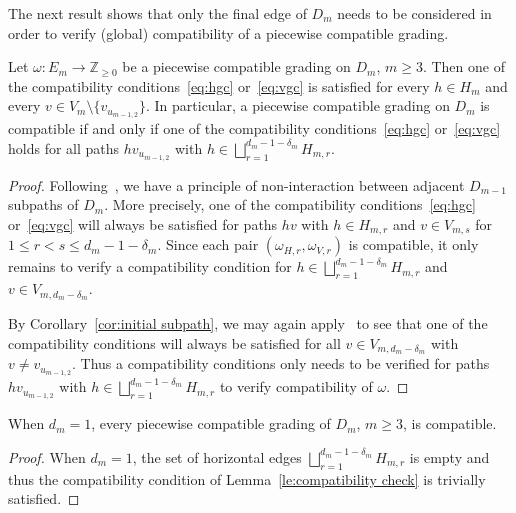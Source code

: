 \documentclass[ALCO,ThmDefs,Unicode,epreuves]{cedram}
\newcommand{\ZZ}{\mathbb{Z}}
\begin{document}
The next result shows that only the final edge of $D_m$ needs to be considered in order to verify (global) compatibility of a piecewise compatible grading.
\begin{lemma}
 \label{le:compatibility check}
 Let $\omega:E_m\to\ZZ_{\ge0}$ be a piecewise compatible grading on $D_m$, $m\ge3$.
 Then one of the compatibility conditions~\eqref{eq:hgc} or~\eqref{eq:vgc} is satisfied for every $h\in H_m$ and every $v\in V_m\setminus\{v_{u_{m-1,2}}\}$.
 In particular, a piecewise compatible grading on $D_m$ is compatible if and only if one of the compatibility conditions~\eqref{eq:hgc} or~\eqref{eq:vgc} holds for all paths $hv_{u_{m-1,2}}$ with $h\in\bigsqcup\limits_{r=1}^{d_m-1-\delta_m} H_{m,r}$.
\end{lemma}
\begin{proof}
 Following~\cite[Remark~2.22]{rupel2}, we have a principle of non-interaction between adjacent $D_{m-1}$ subpaths of $D_m$. 
 More precisely, one of the compatibility conditions~\eqref{eq:hgc} or~\eqref{eq:vgc} will always be satisfied for paths $hv$ with $h\in H_{m,r}$ and $v\in V_{m,s}$ for $1\le r<s\le d_m-1-\delta_m$. 
 Since each pair $(\omega_{H,r},\omega_{V,r})$ is compatible, it only remains to verify a compatibility condition for $h\in\bigsqcup\limits_{r=1}^{d_m-1-\delta_m} H_{m,r}$ and $v\in V_{m,d_m-\delta_m}$. 

 By Corollary~\ref{cor:initial subpath}, we may again apply~\cite[Remark~2.22]{rupel2} to see that one of the compatibility conditions will always be satisfied for all $v\in V_{m,d_m-\delta_m}$ with $v\ne v_{u_{m-1,2}}$.
 Thus a compatibility conditions only needs to be verified for paths $hv_{u_{m-1,2}}$ with $h\in\bigsqcup\limits_{r=1}^{d_m-1-\delta_m} H_{m,r}$ to verify compatibility of $\omega$.
\end{proof}
\begin{corollary}
 \label{cor:automatic compatibility}
 When $d_m=1$, every piecewise compatible grading of $D_m$, $m\ge3$, is compatible.
\end{corollary}
\begin{proof}
 When $d_m=1$, the set of horizontal edges $\bigsqcup\limits_{r=1}^{d_m-1-\delta_m} H_{m,r}$ is empty and thus the compatibility condition of Lemma~\ref{le:compatibility check} is trivially satisfied.
\end{proof}
\end{document}
